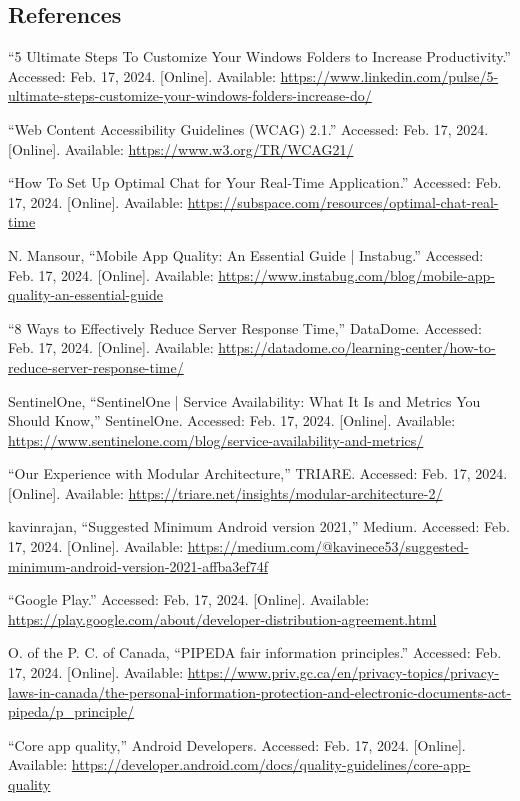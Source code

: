 \documentclass[]{article}
\begin{document}
\subsection{References}
\label{sub:references}
	\begin{thebibliography}{99}
		 “5 Ultimate Steps To Customize Your Windows Folders to Increase Productivity.” Accessed: Feb. 17, 2024. [Online]. Available: \url{https://www.linkedin.com/pulse/5-ultimate-steps-customize-your-windows-folders-increase-do/}

		 “Web Content Accessibility Guidelines (WCAG) 2.1.” Accessed: Feb. 17, 2024. [Online]. Available: \url{https://www.w3.org/TR/WCAG21/}

		 “How To Set Up Optimal Chat for Your Real-Time Application.” Accessed: Feb. 17, 2024. [Online]. Available: \url{https://subspace.com/resources/optimal-chat-real-time}

		 N. Mansour, “Mobile App Quality: An Essential Guide | Instabug.” Accessed: Feb. 17, 2024. [Online]. Available: \url{https://www.instabug.com/blog/mobile-app-quality-an-essential-guide}

		 “8 Ways to Effectively Reduce Server Response Time,” DataDome. Accessed: Feb. 17, 2024. [Online]. Available: \url{https://datadome.co/learning-center/how-to-reduce-server-response-time/}

		 SentinelOne, “SentinelOne | Service Availability: What It Is and Metrics You Should Know,” SentinelOne. Accessed: Feb. 17, 2024. [Online]. Available: \url{https://www.sentinelone.com/blog/service-availability-and-metrics/}

		 “Our Experience with Modular Architecture,” TRIARE. Accessed: Feb. 17, 2024. [Online]. Available: \url{https://triare.net/insights/modular-architecture-2/}

		 kavinrajan, “Suggested Minimum Android version 2021,” Medium. Accessed: Feb. 17, 2024. [Online]. Available: \url{https://medium.com/@kavinece53/suggested-minimum-android-version-2021-affba3ef74f}

		 “Google Play.” Accessed: Feb. 17, 2024. [Online]. Available: \url{https://play.google.com/about/developer-distribution-agreement.html}

		 O. of the P. C. of Canada, “PIPEDA fair information principles.” Accessed: Feb. 17, 2024. [Online]. Available: \url{https://www.priv.gc.ca/en/privacy-topics/privacy-laws-in-canada/the-personal-information-protection-and-electronic-documents-act-pipeda/p_principle/}

		 “Core app quality,” Android Developers. Accessed: Feb. 17, 2024. [Online]. Available: \url{https://developer.android.com/docs/quality-guidelines/core-app-quality}
	\end{thebibliography}
\end{document}
